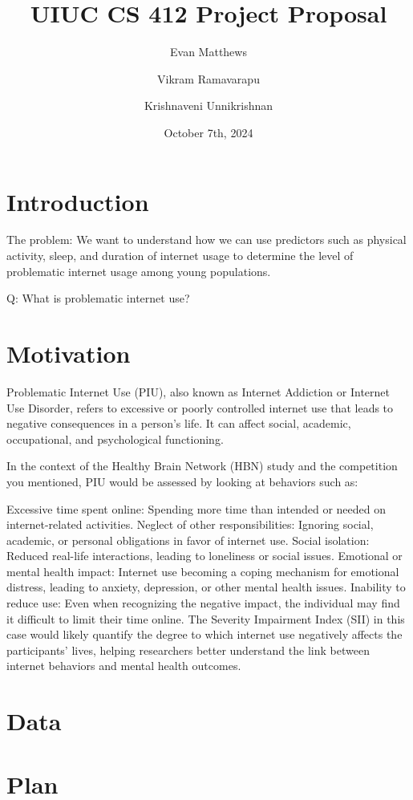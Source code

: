 \documentclass[12pt]{extarticle}
\title{UIUC CS 412 Project Proposal}
\author[1,2]{Evan Matthews}
\author[1,3]{Vikram Ramavarapu}
\author[1,4]{Krishnaveni Unnikrishnan}
\affil[1]{Siebel School of Computing and Data Science}
\affil[2]{Audio Lab}
\affil[3]{\it{Your lab here}}
\affil[4]{\it{Your lab here}}
\date{October 7th, 2024}
\begin{document}
\maketitle

\section{Introduction}

The problem: We want to understand how we can use predictors such as physical activity, sleep, and duration of internet usage to determine the level of problematic internet usage among young populations.

Q: What is problematic internet use? 

\section{Motivation}

Problematic Internet Use (PIU), also known as Internet Addiction or Internet Use Disorder, refers to excessive or poorly controlled internet use that leads to negative consequences in a person's life. 
It can affect social, academic, occupational, and psychological functioning.\cite{child-mind-institute-problematic-internet-use}

In the context of the Healthy Brain Network (HBN) study and the competition you mentioned, PIU would be assessed by looking at behaviors such as:

Excessive time spent online: Spending more time than intended or needed on internet-related activities.
Neglect of other responsibilities: Ignoring social, academic, or personal obligations in favor of internet use.
Social isolation: Reduced real-life interactions, leading to loneliness or social issues.
Emotional or mental health impact: Internet use becoming a coping mechanism for emotional distress, leading to anxiety, depression, or other mental health issues.
Inability to reduce use: Even when recognizing the negative impact, the individual may find it difficult to limit their time online.
The Severity Impairment Index (SII) in this case would likely quantify the degree to which internet use negatively affects the participants' lives, helping researchers better understand the link between internet behaviors and mental health outcomes.

\section{Data}

\section{Plan}



\end{document}
